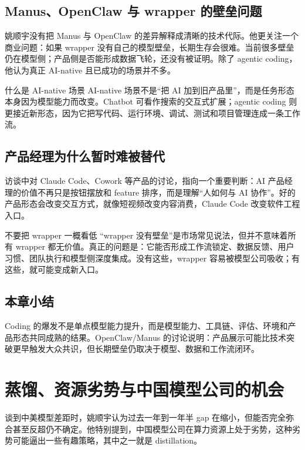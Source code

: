 \documentclass[a4paper]{article}
\begin{document}
\subsection{Manus、OpenClaw 与 wrapper 的壁垒问题}

姚顺宇没有把 Manus 与 OpenClaw 的差异解释成清晰的技术代际。他更关注一个商业问题：如果 wrapper 没有自己的模型壁垒，长期生存会很难。当前很多壁垒仍在模型侧；产品侧是否能形成数据飞轮，还没有被证明。除了 agentic coding，他认为真正 AI-native 且已成功的场景并不多。

\begin{knowledgebox}{什么是 AI-native 场景}
AI-native 场景不是“把 AI 加到旧产品里”，而是任务形态本身因为模型能力而改变。Chatbot 可看作搜索的交互式扩展；agentic coding 则更接近新形态，因为它把写代码、运行环境、调试、测试和项目管理连成一条工作流。
\end{knowledgebox}

\subsection{产品经理为什么暂时难被替代}

访谈中对 Claude Code、Cowork 等产品的讨论，指向一个重要判断：AI 产品经理的价值不再只是按钮摆放和 feature 排序，而是理解“人如何与 AI 协作”。好的产品形态会改变交互方式，就像短视频改变内容消费，Claude Code 改变软件工程入口。

\begin{warningbox}{不要把 wrapper 一概看低}
“wrapper 没有壁垒”是市场常见说法，但并不意味着所有 wrapper 都无价值。真正的问题是：它能否形成工作流锁定、数据反馈、用户习惯、团队执行和模型侧深度集成。没有这些，wrapper 容易被模型公司吸收；有这些，就可能变成新入口。
\end{warningbox}

\subsection{本章小结}

Coding 的爆发不是单点模型能力提升，而是模型能力、工具链、评估、环境和产品形态共同成熟的结果。OpenClaw/Manus 的讨论说明：产品展示可能比技术突破更早触发大众共识，但长期壁垒仍取决于模型、数据和工作流闭环。

\section{蒸馏、资源劣势与中国模型公司的机会}

谈到中美模型差距时，姚顺宇认为过去一年到一年半 gap 在缩小，但能否完全弥合甚至反超仍不确定。他特别提到，中国模型公司在算力资源上处于劣势，这种劣势可能逼出一些有趣策略，其中之一就是 distillation。
\end{document}
